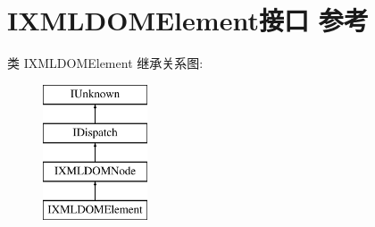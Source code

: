 \hypertarget{interface_i_x_m_l_d_o_m_element}{}\section{I\+X\+M\+L\+D\+O\+M\+Element接口 参考}
\label{interface_i_x_m_l_d_o_m_element}
类 I\+X\+M\+L\+D\+O\+M\+Element 继承关系图\+:\begin{figure}[H]
\begin{center}
\leavevmode
\includegraphics[height=4.000000cm]{interface_i_x_m_l_d_o_m_element}
\end{center}
\end{figure}
